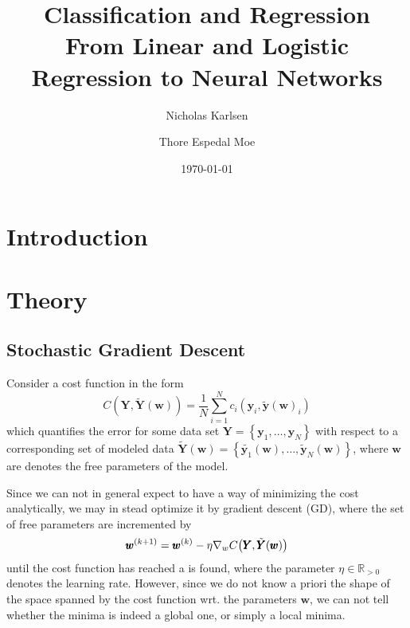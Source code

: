 \documentclass[reprint, english, nofootinbib]{revtex4-2}
\begin{document}
\title{Classification and Regression\\
\normalsize{From Linear and Logistic Regression to Neural Networks}}

\author{Nicholas Karlsen}
\author{Thore Espedal Moe}
\date{\today}

\begin{abstract}
\end{abstract}

\maketitle

\section{Introduction}

\section{Theory}
\subsection{Stochastic Gradient Descent}
\noindent
Consider a cost function in the form
\begin{equation}
    C(\pmb Y, \tilde{\pmb Y}(\pmb w)) = \frac{1}{N}\sum_{i=1}^{N}c_i(\pmb y_i, \tilde{\pmb y}(\pmb w)_i)
\end{equation}
which quantifies the error for some data set $\pmb Y = \left\{\pmb y_1, \dots, \pmb y_N\right\}$ with respect to a corresponding set of modeled data $\tilde{\pmb Y}(\pmb w) = \left\{\tilde{\pmb y_1}(\pmb w), \dots, \tilde{\pmb y}_N(\pmb w)\right\}$, where $\pmb w$ are denotes the free parameters of the model.

Since we can not in general expect to have a way of minimizing the cost analytically, we may in stead optimize it by gradient descent (GD), where the set of free parameters are incremented by
\begin{equation}
    \pmb w^{(k+1)} = \pmb w^{(k)} - \eta \nabla_{w}C\qty(\pmb Y, \tilde{\pmb Y}(\pmb w))
\end{equation}
until the cost function has reached a is found, where the parameter $\eta \in \mathbb R_{>0}$ denotes the learning rate. However, since we do not know a priori the shape of the space spanned by the cost function wrt. the parameters $\pmb w$, we can not tell whether the minima is indeed a global one, or simply a local minima.
\end{document}
